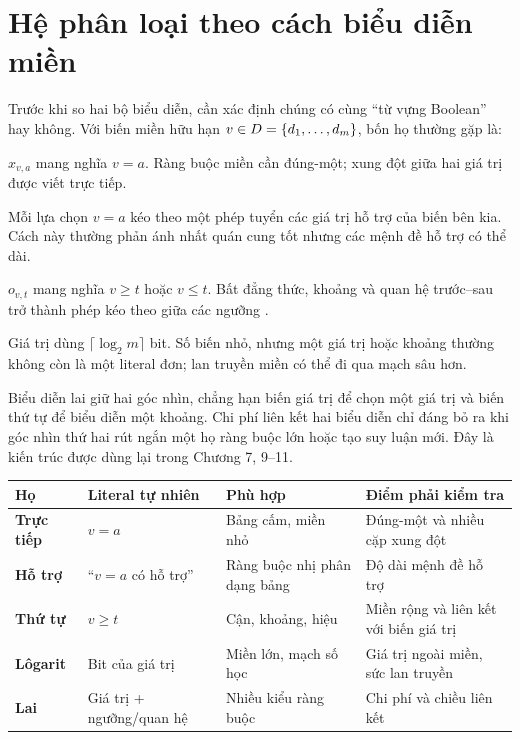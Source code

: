 \section{Hệ phân loại theo cách biểu diễn miền}

Trước khi so hai bộ biểu diễn, cần xác định chúng có cùng ``từ vựng Boolean'' hay
không. Với biến miền hữu hạn \(v\in D=\left\{d_1,\ldots,d_m\right\}\), bốn họ thường
gặp là:
\begin{description}[style=nextline]
  \item[Direct Encoding (biểu diễn trực tiếp)]
  \(x_{v,a}\) mang nghĩa \(v=a\). Ràng buộc miền cần đúng-một; xung đột giữa
  hai giá trị được viết trực tiếp.

  \item[Support Encoding (biểu diễn hỗ trợ)]
  Mỗi lựa chọn \(v=a\) kéo theo một phép tuyển các giá trị hỗ trợ của biến bên
  kia. Cách này thường phản ánh nhất quán cung tốt nhưng các mệnh đề hỗ trợ có
  thể dài.

  \item[Order Encoding (biểu diễn thứ tự)]
  \(o_{v,t}\) mang nghĩa \(v\ge t\) hoặc \(v\le t\). Bất đẳng thức, khoảng và
  quan hệ trước--sau trở thành phép kéo theo giữa các ngưỡng
  \parencite{tamura2009csp}.

  \item[Log/binary encoding (biểu diễn lôgarit/nhị phân)]
  Giá trị dùng \(\lceil\log_2m\rceil\) bit. Số biến nhỏ, nhưng một giá trị hoặc
  khoảng thường không còn là một literal đơn; lan truyền miền có thể đi qua
  mạch sâu hơn.
\end{description}

Biểu diễn lai giữ hai góc nhìn, chẳng hạn biến giá trị để chọn một giá trị và biến
thứ tự để biểu diễn một khoảng. Chi phí liên kết hai biểu diễn chỉ đáng bỏ ra
khi góc nhìn thứ hai rút ngắn một họ ràng buộc lớn hoặc tạo suy luận mới. Đây
là kiến trúc được dùng lại trong Chương 7, 9--11.

\begin{center}
\label{tab:domain-encodings}
\begin{tabularx}{\textwidth}{@{}>{\bfseries\sffamily}p{}YYY@{}}
\toprule
Họ & Literal tự nhiên & Phù hợp & Điểm phải kiểm tra\\
\midrule
Trực tiếp & \(v=a\) & Bảng cấm, miền nhỏ & Đúng-một và nhiều cặp xung đột\\
Hỗ trợ & ``\(v=a\) có hỗ trợ'' & Ràng buộc nhị phân dạng bảng & Độ dài mệnh đề hỗ trợ\\
Thứ tự & \(v\ge t\) & Cận, khoảng, hiệu & Miền rộng và liên kết với biến giá trị\\
Lôgarit & Bit của giá trị & Miền lớn, mạch số học & Giá trị ngoài miền, sức lan truyền\\
Lai & Giá trị + ngưỡng/quan hệ & Nhiều kiểu ràng buộc & Chi phí và chiều liên kết\\
\bottomrule
\end{tabularx}
\end{center}

